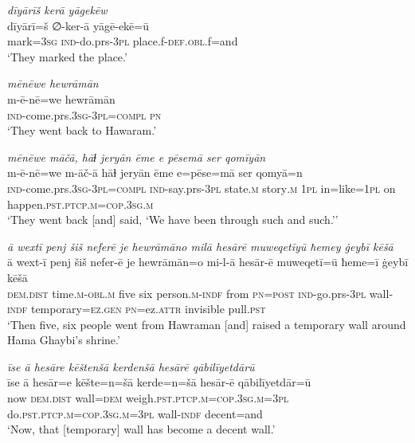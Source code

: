 \ea \label{BP.200}
\textit{dīyārīš kerā yāgekēw} \\ 
\gll dīyārī=š ∅-ker-ā yāgē-ekē=ū \\ 
 mark\textsc{=3sg} \textsc{ind-}do.prs\textsc{-3pl} place.f\textsc{-def}\textsc{.obl}.f=and \\ 
\glt `They marked the place.'
\z 
 
\ea \label{BP.201}
\textit{mēnēwe hewrāmān} \\ 
\gll m-ē-nē=we hewrāmān \\ 
 \textsc{ind-}come.prs\textsc{.3sg}\textsc{-3pl}\textsc{=compl} \textsc{pn} \\ 
\glt `They went back to Hawaram.'
\z 
 
\ea \label{BP.202}
\textit{mēnēwe māčā, hāɫ jeryān ēme e pēsemā ser qomīyān} \\ 
\gll m-ē-nē=we m-āč-ā hāɫ jeryān ēme e=pēse=mā ser qomyā=n \\ 
 \textsc{ind-}come.prs\textsc{.3sg}\textsc{-3pl}\textsc{=compl} \textsc{ind-}say.prs\textsc{-3pl} state\textsc{.m} story\textsc{.m} \textsc{1pl} in=like\textsc{=\textsc{1pl}} on happen\textsc{.pst}\textsc{.ptcp}\textsc{.m}\textsc{=cop}\textsc{.3sg}\textsc{.m} \\ 
\glt `They went back [and] said, ‘We have been through such and such.’'
\z 
 
\ea \label{BP.203}
\textit{ā wextī penj šiš neferē je hewrāmāno milā hesārē muweqetīyū ħemey ġeybī kēšā} \\ 
\gll ā wext-ī penj šiš nefer-ē je hewrāmān=o mi-l-ā hesār-ē muweqetī=ū ħeme=ī ġeybī kēšā \\ 
 \textsc{dem.dist} time\textsc{.m}\textsc{-obl}\textsc{.m} five six person\textsc{.m}\textsc{-indf} from \textsc{pn}\textsc{=\textsc{post}} \textsc{ind-}go.prs\textsc{-3pl} wall\textsc{-indf} temporary\textsc{=ez.gen} \textsc{pn}=ez.\textsc{attr} invisible pull\textsc{.pst} \\ 
\glt `Then five, six people went from Hawraman [and] raised a temporary wall around Hama Ghaybi’s shrine.'
\z 
 
\ea \label{BP.204}
\textit{īse ā hesāre kēštenšā kerdenšā hesārē qābilīyetdārū} \\ 
\gll īse ā hesār=e kēšte=n=šā kerde=n=šā hesār-ē qābilīyetdār=ū \\ 
 now \textsc{dem.dist} wall\textsc{=dem} weigh\textsc{.pst}\textsc{.ptcp}\textsc{.m}\textsc{=cop}\textsc{.3sg}\textsc{.m}\textsc{=3pl} do\textsc{.pst}\textsc{.ptcp}\textsc{.m}\textsc{=cop}\textsc{.3sg}\textsc{.m}\textsc{=3pl} wall\textsc{-indf} decent=and \\ 
\glt `Now, that [temporary] wall has become a decent wall.'
\z 
 
